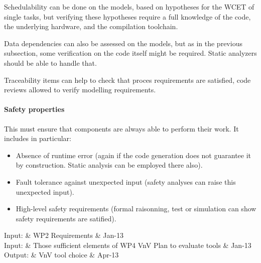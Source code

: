 \documentclass{template/openetcs_article}
\begin{document}
Schedulability can be done on the models, based on hypotheses for the WCET of
single tasks, but verifying these hypotheses require a full knowledge of
the code, the underlying hardware, and the compilation toolchain.

Data dependencies can also be assessed on the models, but as in the previous
subsection, some verification on the code itself might be required. Static
analyzers should be able to handle that.

Traceability  items can help  to  check  that proces requirements are satisfied, code reviews allowed to  verify modelling requirements.

\paragraph{Safety properties}


This must ensure that components are always able to perform their work.
It includes in particular:
\begin{itemize}
  \item Absence of runtime error (again if the code generation does
        not guarantee it by construction. Static analysis can be employed
        there also).
  \item Fault tolerance against unexpected input (safety analyses can raise this unexpected input).
  \item High-level safety requirements (formal raisonning, test or simulation can show safety requirements are satified).
\end{itemize}

\begin{inoutput}
Input: & WP2 Requirements & Jan-13 \\
Input: & Those sufficient elements of WP4 VnV Plan to evaluate tools & Jan-13 \\
\hline
Output: & VnV tool choice & Apr-13 \\
\end{inoutput}
\end{document}
